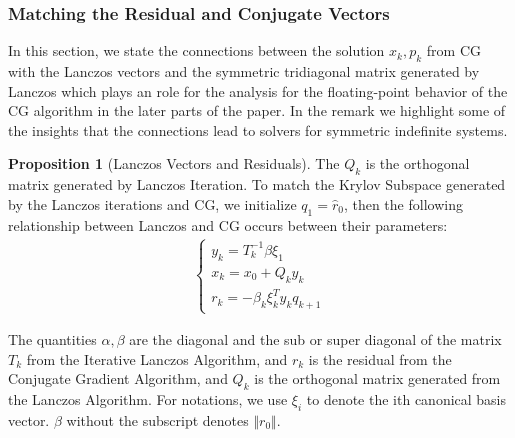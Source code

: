 \documentclass[]{article}
\theoremstyle{definition}
\newtheorem{prop}{Proposition}[section]  %
\begin{document}
        \subsubsection{Matching the Residual and Conjugate Vectors}
            In this section, we state the connections between the solution $x_k, p_k$ from CG with the Lanczos vectors and the symmetric tridiagonal matrix generated by Lanczos which plays an  role for the analysis for the floating-point behavior of the CG algorithm in the later parts of the paper. In the remark we highlight some of the insights that the connections lead to solvers for symmetric indefinite systems. 
            \begin{prop}[Lanczos Vectors and Residuals]\label{prop:Lanczos_Vectors_and_Residuals}
                The $Q_k$ is the orthogonal matrix generated by Lanczos Iteration. To match the Krylov Subspace generated by the Lanczos iterations and CG, we initialize $q_1 = \hat{r}_0$, then the following relationship between Lanczos and CG occurs between their parameters: 
                \begin{align}
                    \begin{cases}
                        y_k = T^{-1}_k \beta\xi_1
                        \\
                        x_k = x_0 + Q_k y_k
                        \\
                        r_k = -\beta_{k}\xi_k^T y_k q_{k +1}
                    \end{cases}
                \end{align}
            \end{prop}
            The quantities $\alpha, \beta$ are the diagonal and the sub or super diagonal of the matrix $T_k$ from the Iterative Lanczos Algorithm, and $r_k$ is the residual from the Conjugate Gradient Algorithm, and $Q_k$ is the orthogonal matrix generated from the Lanczos Algorithm. For notations, we use $\xi_i$ to denote the ith canonical basis vector. $\beta$  without the subscript denotes $\Vert r_0\Vert$.
\end{document}
